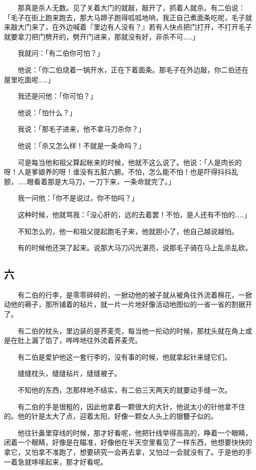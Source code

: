 \documentclass[UTF8]{ctexart}
\begin{document}
　　那真是杀人无数。见了关着大门的就敲，敲开了，抓着人就杀。有二伯说：「毛子在街上跑来跑去，那大马蹄子跑得呱呱地响，我正自己煮面条吃呢，毛子就来敲大门来了，在外边喊着『里边有人没有？』若有人快点把门打开，不打开毛子就要拿刀把门劈开的，劈开门进来，那就没有好，非杀不可……」

　　我就问：「有二伯你可怕？」

　　他说：「你二伯烧着一锅开水，正在下着面条。那毛子在外边敲，你二伯还在屋里吃面呢……」

　　我还是问他：「你可怕？」

　　他说：「怕什么？」

　　我说：「那毛子进来，他不拿马刀杀你？」

　　他说：「杀又怎么样！不就是一条命吗？」

　　可是每当他和祖父算起帐来的时候，他就不这么说了。他说：「人是肉长的呀！人是爹娘养的呀！谁没有五脏六腑。不怕，怎么能不怕！也是吓得抖抖乱颤，……眼看着那是大马刀，一刀下来，一条命就完了。」

　　我一问他：「你不是说过，你不怕吗？」

　　这种时候，他就骂我：「没心肝的，远的去着罢！不怕，是人还有不怕的……」

　　不知怎么的，他一和祖父提起跑毛子来，他就胆小了，他自己越说越怕。

　　有的时候他还哭了起来。说那大马刀闪光湛亮，说那毛子骑在马上乱杀乱砍。

\subsection{六}

　　有二伯的行李，是零零碎碎的，一掀动他的被子就从被角往外流着棉花，一掀动他的褥子，那所铺着的毡片，就一片一片地好像活动地图似的一省一省的割据开了。

　　有二伯的枕头，里边装的是荞麦壳，每当他一抡动的时候，那枕头就在角上或是在肚上漏了馅了，哗哗地往外流着荞麦壳。

　　有二伯是爱护他这一套行李的，没有事的时候，他就拿起针来缝它们。

　　缝缝枕头，缝缝毡片，缝缝被子。

　　不知他的东西，怎那样地不结实，有二伯三天两天的就要动手缝一次。

　　有二伯的手是很粗的，因此他拿着一颗很大的大针，他说太小的针他拿不住的。他的针是太大了点，迎着太阳，好像一颗女人头上的银簪子似的。

　　他往针鼻里穿线的时候，那才好看呢，他把针线举得高高的，睁着一个眼睛，闭着一个眼睛，好像是在瞄准，好像他在半天空里看见了一样东西，他想要快快的拿它，又怕拿不准跑了，想要研究一会再去拿，又怕过一会就没有了。于是他的手一着急就哆嗦起来，那才好看呢。
\end{document}
